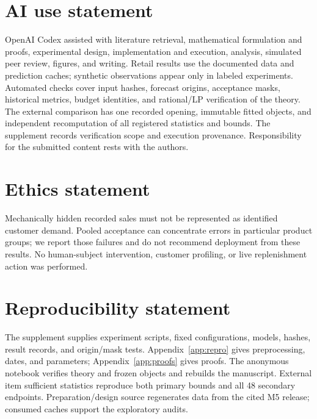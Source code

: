 \documentclass{article}
\begin{document}
\label{end:main}

\clearpage
\section*{AI use statement}
OpenAI Codex assisted with literature retrieval, mathematical formulation and proofs, experimental design, implementation and execution, analysis, simulated peer review, figures, and writing. Retail results use the documented data and prediction caches; synthetic observations appear only in labeled experiments. Automated checks cover input hashes, forecast origins, acceptance masks, historical metrics, budget identities, and rational/LP verification of the theory. The external comparison has one recorded opening, immutable fitted objects, and independent recomputation of all registered statistics and bounds. The supplement records verification scope and execution provenance. Responsibility for the submitted content rests with the authors.

\section*{Ethics statement}
Mechanically hidden recorded sales must not be represented as identified customer demand. Pooled acceptance can concentrate errors in particular product groups; we report those failures and do not recommend deployment from these results. No human-subject intervention, customer profiling, or live replenishment action was performed.

\section*{Reproducibility statement}
The supplement supplies experiment scripts, fixed configurations, models, hashes, result records, and origin/mask tests. Appendix~\ref{app:repro} gives preprocessing, dates, and parameters; Appendix~\ref{app:proofs} gives proofs. The anonymous notebook verifies theory and frozen objects and rebuilds the manuscript. External item sufficient statistics reproduce both primary bounds and all 48 secondary endpoints. Preparation/design source regenerates data from the cited M5 release; consumed caches support the exploratory audits.



\appendix
\renewcommand{\topfraction}{0.9}
\renewcommand{\bottomfraction}{0.9}
\renewcommand{\textfraction}{0.08}
\renewcommand{\floatpagefraction}{0.85}
\setcounter{topnumber}{4}
\setcounter{totalnumber}{5}

\end{document}
